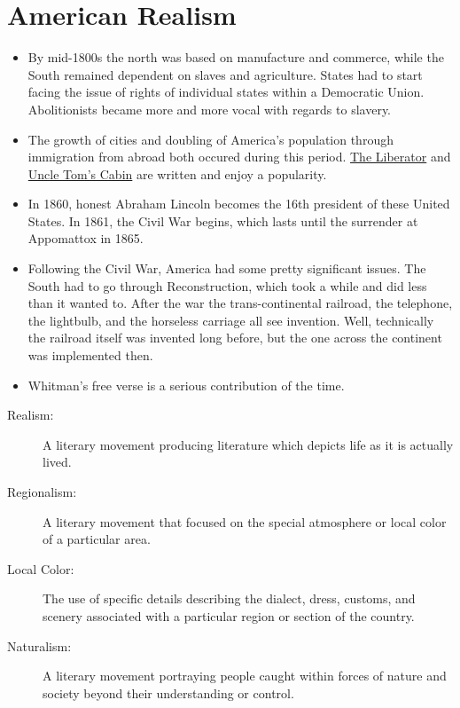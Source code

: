 \documentclass[10pt]{article}
\begin{document}
\section{American Realism}
\begin{itemize}
	\item By mid-1800s the north was based on manufacture and commerce, 
		while the South remained dependent on slaves and agriculture.  
		States had to start facing the issue of rights of individual 
		states within a Democratic Union.  Abolitionists became more 
		and more vocal with regards to slavery.  
	\item The growth of cities and doubling of America's population 
		through immigration from abroad both occured during this 
		period.  \underline{The Liberator} and \underline{Uncle Tom's 
		Cabin} are written and enjoy a popularity.
	\item In 1860, honest Abraham Lincoln becomes the 16th president of 
		these United States.  In 1861, the Civil War begins, which 
		lasts until the surrender at Appomattox in 1865.
	\item Following the Civil War, America had some pretty significant 
		issues.  The South had to go through Reconstruction, which 
		took a while and did less than it wanted to.  After the war 
		the trans-continental railroad, the telephone, the lightbulb, 
		and the horseless carriage all see invention.  Well, 
		technically the railroad itself was invented long before, but 
		the one across the continent was implemented then.
	\item Whitman's free verse is a serious contribution of the time.
\end{itemize}

\begin{description}
	\item[Realism:] A literary movement producing literature which depicts 
		life as it is actually lived.
	\item[Regionalism:] A literary movement that focused on the special 
		atmosphere or local color of a particular area.
	\item[Local Color:] The use of specific details describing the 
		dialect, dress, customs, and scenery associated with a 
		particular region or section of the country.
	\item[Naturalism:] A literary movement portraying people caught within 
		forces of nature and society beyond their understanding or control.  
\end{description}
\end{document}
